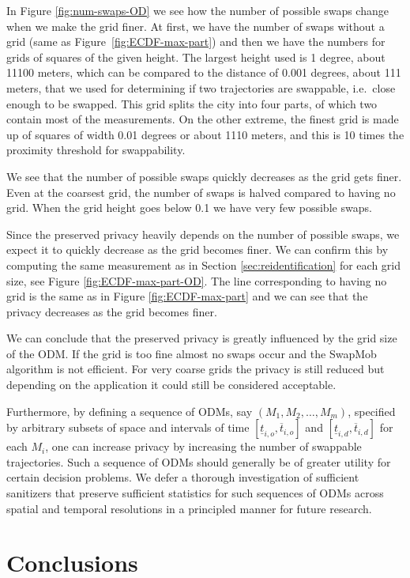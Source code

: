 \documentclass{llncs}
\begin{document}
In Figure \ref{fig:num-swaps-OD} we see how the number of possible
swaps change when we make the grid finer. At first, we have the number
of swaps without a grid (same as Figure~\ref{fig:ECDF-max-part}) and then we have the numbers for grids of
squares of the given height. The largest height used is 1 degree, about
11100 meters, which can be compared to the distance of 0.001 degrees,
about 111 meters, that we used for determining if two trajectories are swappable, i.e.~close enough to be swapped.  
This grid splits the city into four parts, of which two contain
most of the measurements. On the other extreme, the finest grid is made up of squares of width 0.01 degrees or about 1110 meters, and this is 10 times the proximity threshold for swappability.

We see that the number of possible swaps quickly decreases as the grid
gets finer. Even at the coarsest grid, the number of swaps is halved
compared to having no grid. When the grid height goes below 0.1 we have
very few possible swaps.

Since the preserved privacy heavily depends on the number of possible
swaps, we expect it to quickly decrease as the grid becomes finer. We
can confirm this by computing the same measurement as in Section
\ref{sec:reidentification} for each grid size, see Figure
\ref{fig:ECDF-max-part-OD}. The line corresponding to having no grid
is the same as in Figure \ref{fig:ECDF-max-part} and we can see that
the privacy decreases as the grid becomes finer.

We can conclude that the preserved privacy is greatly influenced by
the grid size of the ODM. If the grid is too fine almost no swaps occur
and the SwapMob algorithm is not efficient. For very coarse grids the
privacy is still reduced but depending on the application it could still
be considered acceptable.

Furthermore, by defining a sequence of ODMs, say $(M_1,M_2,\ldots,M_m)$, specified by arbitrary subsets of space 
and intervals of time $[\underline{t}_{i,o},\overline{t}_{i,o}]$ and $[\underline{t}_{i,d},\overline{t}_{i,d}]$ for each $M_i$, one can increase privacy by increasing the number of swappable trajectories. Such a sequence of ODMs should generally be of greater utility for certain decision problems. We defer a thorough investigation of sufficient sanitizers that preserve sufficient statistics for such sequences of ODMs across spatial and temporal resolutions in a principled manner for future research.  

\section{Conclusions}
\end{document}
